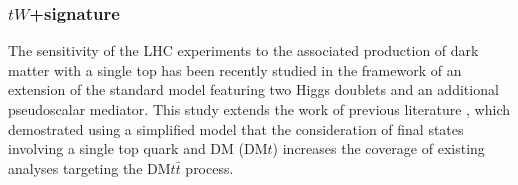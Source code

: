 %

\subsubsection{$tW$+\met signature}

The sensitivity of the LHC experiments to the associated production of dark matter with a single top has been recently studied \cite{Pani:2017qyd} in the framework of an extension of the standard model featuring two Higgs doublets and an additional pseudoscalar mediator. 
This study extends the work of previous literature \cite{Pinna:2017tay}, which demostrated using a simplified model that the consideration of final states involving a single top quark and DM (DM$t$) increases the coverage of existing analyses targeting the DM$t\bar t$ process.  

